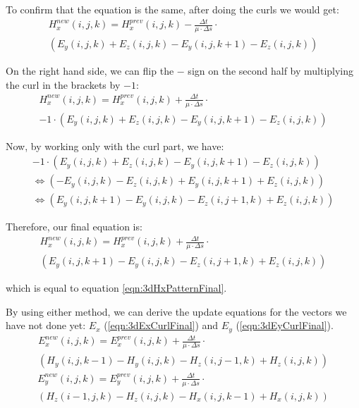 To confirm that the equation is the same, after doing the curls we would get:
\begin{multline}
	\label{eqn:3dHxCurl1}
	H_x^{new}(i,j,k) =  H_x^{prev}(i,j,k) - \frac{\Delta t}{\mu \cdot \Delta s} \cdot \\ (E_y(i,j,k) + E_z(i,j,k) - E_y(i,j,k+1) - E_z(i,j,k))
\end{multline}

On the right hand side, we can flip the $-$ sign on the second half by multiplying the curl in the brackets by $-1$:
\begin{multline}
	\label{eqn:3dHxCurl2}
	H_x^{new}(i,j,k) =  H_x^{prev}(i,j,k) + \frac{\Delta t}{\mu \cdot \Delta s} \cdot \\ -1 \cdot (E_y(i,j,k) + E_z(i,j,k) - E_y(i,j,k+1) - E_z(i,j,k))
\end{multline}

Now, by working only with the curl part, we have:
\begin{multline}
	-1 \cdot (E_y(i,j,k) + E_z(i,j,k) - E_y(i,j,k+1) - E_z(i,j,k)) \\
	\Leftrightarrow (- E_y(i,j,k) - E_z(i,j,k) + E_y(i,j,k+1) + E_z(i,j,k)) \\
	\Leftrightarrow (E_y(i,j,k+1) - E_y(i,j,k) - E_z(i,j+1,k) + E_z(i,j,k))
\end{multline}

Therefore, our final equation is:
\begin{multline}
	\label{eqn:3dHxCurlFinal}
	H_x^{new}(i,j,k) =  H_x^{prev}(i,j,k) + \frac{\Delta t}{\mu \cdot \Delta s} \cdot \\ (E_y(i,j,k+1) - E_y(i,j,k) - E_z(i,j+1,k) + E_z(i,j,k))
\end{multline}

which is equal to equation \ref{eqn:3dHxPatternFinal}.

By using either method, we can derive the update equations for the vectors we have not done yet: $E_x$ (\ref{eqn:3dExCurlFinal}) and $E_y$ (\ref{eqn:3dEyCurlFinal}).
\begin{multline}
	\label{eqn:3dExCurlFinal}
	E_x^{new}(i,j,k) =  E_x^{prev}(i,j,k) + \frac{\Delta t}{\mu \cdot \Delta s} \cdot \\ (H_y(i,j,k-1) - H_y(i,j,k) - H_z(i,j-1,k) + H_z(i,j,k))
\end{multline}
\begin{multline}
	\label{eqn:3dEyCurlFinal}
	E_y^{new}(i,j,k) =  E_y^{prev}(i,j,k) + \frac{\Delta t}{\mu \cdot \Delta s} \cdot \\ (H_z(i-1,j,k) - H_z(i,j,k) - H_x(i,j,k-1) + H_x(i,j,k))
\end{multline}

